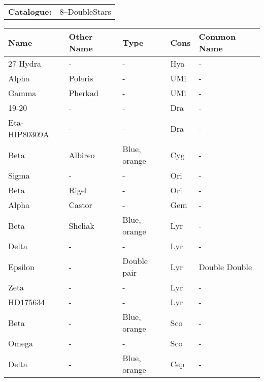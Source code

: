 \begin{tabular}{ p{0.9in} p{1.3in}}
{\bf Catalogue:} & 8--DoubleStars \\ 
\end{tabular}
\centering 
\begin{longtable}{ p{0.7in}  p{1.0in}  p{0.6in}  p{0.9in}  p{4.0in} }
\hline 
{\bf Name} & {\bf Other Name} & {\bf Type} & {\bf Cons} & {\bf Common Name} \\ 
\hline 
27 Hydra & - & - & Hya & - \\ 
Alpha & Polaris & - & UMi & - \\ 
Gamma & Pherkad & - & UMi & - \\ 
19-20 & - & - & Dra & - \\ 
Eta-HIP80309A & - & - & Dra & - \\ 
Beta & Albireo & Blue, orange & Cyg & - \\ 
Sigma & - & - & Ori & - \\ 
Beta & Rigel & - & Ori & - \\ 
Alpha & Castor & - & Gem & - \\ 
Beta & Sheliak & Blue, orange & Lyr & - \\ 
Delta & - & - & Lyr & - \\ 
Epsilon & - & Double pair & Lyr & Double Double \\ 
Zeta & - & - & Lyr & - \\ 
HD175634 & - & - & Lyr & - \\ 
Beta & - & Blue, orange & Sco & - \\ 
Omega & - & - & Sco & - \\ 
Delta & - & Blue, orange & Cep & - \\ 
\hline 
\end{longtable} 

